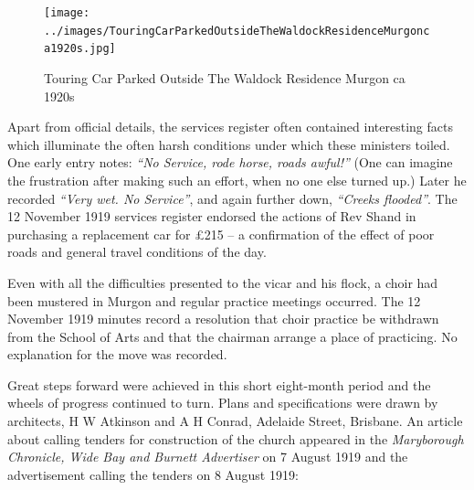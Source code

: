 \begin{figure}[!htb]
\begin{center}
\texttt{[image: ../images/TouringCarParkedOutsideTheWaldockResidenceMurgonca1920s.jpg]}
\caption{Touring Car Parked Outside The Waldock Residence Murgon ca 1920s}
\end{center}
\end{figure}




Apart from official details, the services register often contained interesting facts which illuminate the often harsh conditions under which these ministers toiled. One early entry notes: \emph{``No Service, rode horse, roads awful!''} (One can imagine the frustration after making such an effort, when no one else turned up.) Later he recorded \emph{``Very wet. No Service''}, and again further down, \emph{``Creeks flooded''}. The 12 November 1919 services register endorsed the actions of Rev Shand in purchasing a replacement car for \pounds215 -- a confirmation of the effect of poor roads and general travel conditions of the day.



Even with all the difficulties presented to the vicar and his flock, a choir had been mustered in Murgon and regular practice meetings occurred. The 12 November 1919 minutes record a resolution that choir practice be withdrawn from the School of Arts and that the chairman arrange a place of practicing. No explanation for the move was recorded.



Great steps forward were achieved in this short eight-month period and the wheels of progress continued to turn. Plans and specifications were drawn by architects, H W Atkinson and A H Conrad, Adelaide Street, Brisbane. An article about calling tenders for construction of the church appeared in the \emph{Maryborough Chronicle, Wide Bay and Burnett Advertiser} on 7 August 1919 and the advertisement calling the tenders on 8 August 1919:









